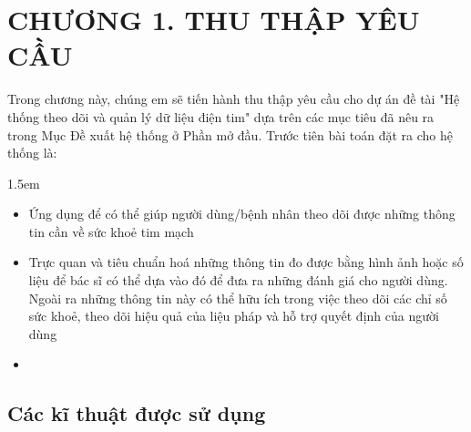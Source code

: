 
\section*{CHƯƠNG 1. THU THẬP YÊU CẦU}
\setcounter{section}{1}
\setcounter{subsection}{0} %
\setcounter{table}{0} %
\setcounter{figure}{0} %
Trong chương này, chúng em sẽ tiến hành thu thập yêu cầu cho dự án đề tài "Hệ thống theo dõi và quản lý dữ liệu điện tim" dựa trên các mục tiêu
đã nêu ra trong Mục Đề xuất hệ thống ở Phần mở đầu. Trước tiên bài toán đặt ra cho hệ thống là:

\begin{adjustwidth}{1.5em}{}
    \begin{itemize}
        \item Ứng dụng để có thể giúp người dùng/bệnh nhân theo dõi được những thông tin cần về sức khoẻ tim mạch
        \item Trực quan và tiêu chuẩn hoá những thông tin đo được bằng hình ảnh hoặc số liệu để bác sĩ có thể dựa vào đó để đưa ra những đánh giá cho người dùng. Ngoài ra những thông tin này có thể hữu ích trong việc theo dõi các chỉ số sức khoẻ, theo dõi hiệu quả của liệu pháp và hỗ trợ quyết định của người dùng
        \item 
    \end{itemize}
\end{adjustwidth}
\subsection{Các kĩ thuật được sử dụng}

